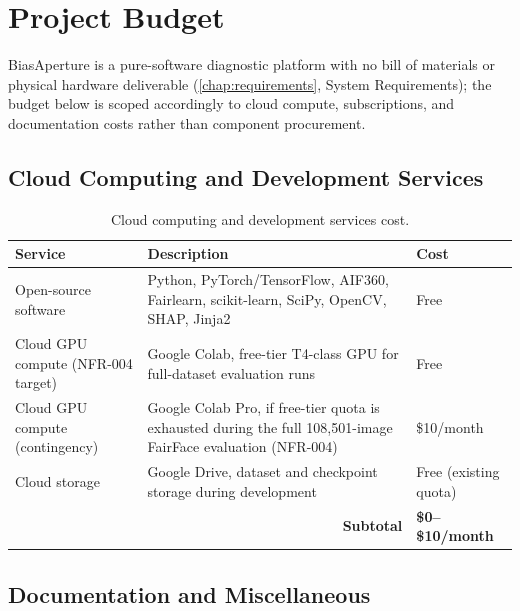 \chapter{Project Budget}
\label{app:budget}

BiasAperture is a pure-software diagnostic platform with no bill of materials or physical hardware deliverable (\cref{chap:requirements}, System Requirements); the budget below is scoped accordingly to cloud compute, subscriptions, and documentation costs rather than component procurement.

\section{Cloud Computing and Development Services}

\begin{table}[H]
    \centering
    \small
    \caption{Cloud computing and development services cost.}
    \label{tab:budget-cloud}
    \begin{tabular}{p{3.5cm}p{6.3cm}p{2.5cm}}
        \toprule
        \textbf{Service} & \textbf{Description} & \textbf{Cost} \\
        \midrule
        Open-source software & Python, PyTorch/TensorFlow, AIF360, Fairlearn, scikit-learn, SciPy, OpenCV, SHAP, Jinja2 & Free \\
        Cloud GPU compute (NFR-004 target) & Google Colab, free-tier T4-class GPU for full-dataset evaluation runs & Free \\
        Cloud GPU compute (contingency) & Google Colab Pro, if free-tier quota is exhausted during the full 108{,}501-image FairFace evaluation (NFR-004) & \$10/month \\
        Cloud storage & Google Drive, dataset and checkpoint storage during development & Free (existing quota) \\
        \midrule
        \multicolumn{2}{r}{\textbf{Subtotal}} & \textbf{\$0--\$10/month} \\
        \bottomrule
    \end{tabular}
\end{table}

\section{Documentation and Miscellaneous}

